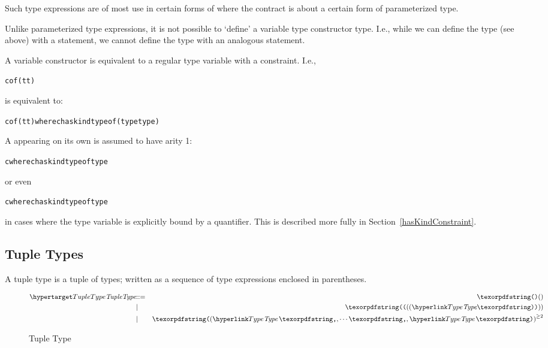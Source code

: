 Such type expressions are of most use in certain forms of  where the contract is about a certain form of parameterized type.

\begin{aside}
Unlike parameterized type expressions, it is not possible to `define' a variable type constructor type. I.e., while we can define the  type (see above) with a  statement, we cannot define the type  with an analogous statement.
\end{aside}

\begin{aside}
A variable constructor is equivalent to a regular type variable with a  constraint. I.e., 
\begin{alltt}
\pcent{}\pcent{}c of (\pcent{}t\sequence{,}\pcent{}t\subn)
\end{alltt}
is equivalent to:
\begin{alltt}
\pcent{}c of (\pcent{}t\sequence{,}\pcent{}t\subn) where \pcent{}c has kind type of (type\sequence{,}type)
\end{alltt}
A  appearing on its own is assumed to have arity 1:
\begin{alltt}
\pcent{}c where \pcent{}c has kind type of type
\end{alltt}
or even
\begin{alltt}
c where c has kind type of type
\end{alltt}
in cases where the type variable  is explicitly bound by a quantifier.
This is described more fully in Section~\vref{hasKindConstraint}.
\end{aside}

\subsection{Tuple Types}
\label{tupleType}
A tuple type is a tuple of types; written as a sequence of type expressions enclosed in parentheses.

\begin{figure}[htbp]
\begin{eqnarray*}
\ntDef{TupleType}&\arrow&\q{()}\\
&\choice&\q{((}\ntRef{Type}\q{))}\\
&\choice&\q{(}\ntRef{Type}\sequence{,}\ntRef{Type}\,\q{)}\plustwo
\end{eqnarray*}
\caption{Tuple Type}
\label{tupleTypeFig}
\end{figure}

